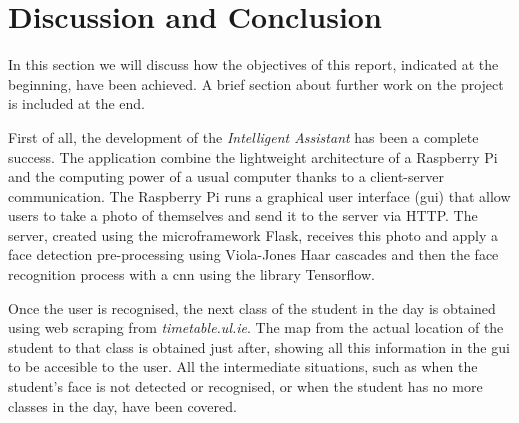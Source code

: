 \chapter{Discussion and Conclusion}
\label{ch:conclussions}
In this section we will discuss how the objectives of this report, indicated at the beginning, have been achieved. A brief section about further work on the project is included at the end.

First of all, the development of the \textit{Intelligent Assistant} has been a complete success. The application combine the lightweight architecture of a Raspberry Pi and the computing power of a usual computer thanks to a client-server communication. The Raspberry Pi runs a graphical user interface (\gls{gui}) that allow users to take a photo of themselves and send it to the server via HTTP. The server, created using the microframework Flask, receives this photo and apply a face detection pre-processing using Viola-Jones Haar cascades and then the face recognition process with a \gls{cnn} using the library Tensorflow.

Once the user is recognised, the next class of the student in the day is obtained using web scraping from \textit{timetable.ul.ie}. The map from the actual location of the student to that class is obtained just after, showing all this information in the \gls{gui} to be accesible to the user. All the intermediate situations, such as when the student's face is not detected or recognised, or when the student has no more classes in the day, have been covered. 

